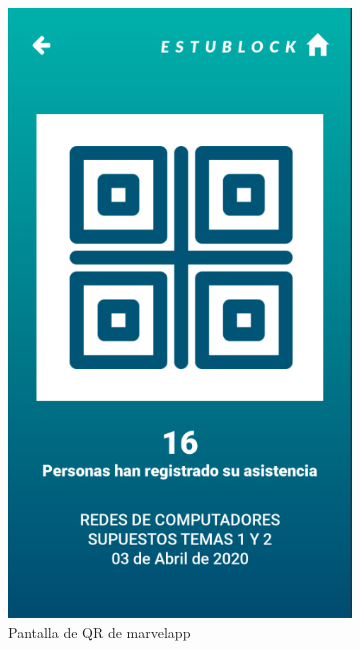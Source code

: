 \begin{figure}[hbt]
	\centering
	\begin{subfigure}[b]{0.4\linewidth}
		\centering
        \includegraphics[width=0.7\linewidth]{figs/Desarrollo/Interfaz/marvel_QR}
        \caption[Marvel QR]{Pantalla de QR de marvelapp}
	\end{subfigure} 
	\begin{subfigure}[b]{0.4\linewidth}
		\centering

\end{subfigure}
\end{figure}
